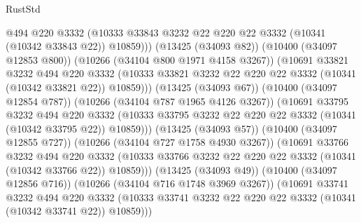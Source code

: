 \begin{lexlean}{RustStd}
\begin{coremodule}
                            @494
                            @220
                            @3332
                            (@10333
                              @33843
                              @3232
                              @22
                              @220
                              @22
                              @3332
                              (@10341 (@10342 @33843 @22))
                              @10859)))
                        (@13425 (@34093 @82))
                        (@10400 (@34097 @12853 @800))
                        (@10266 (@34104 @800 @1971 @4158 @3267))
                        (@10691
                          @33821
                          @3232
                          @494
                          @220
                          @3332
                          (@10333
                            @33821
                            @3232
                            @22
                            @220
                            @22
                            @3332
                            (@10341 (@10342 @33821 @22))
                            @10859)))
                      (@13425 (@34093 @67))
                      (@10400 (@34097 @12854 @787))
                      (@10266 (@34104 @787 @1965 @4126 @3267))
                      (@10691
                        @33795
                        @3232
                        @494
                        @220
                        @3332
                        (@10333
                          @33795
                          @3232
                          @22
                          @220
                          @22
                          @3332
                          (@10341 (@10342 @33795 @22))
                          @10859)))
                    (@13425 (@34093 @57))
                    (@10400 (@34097 @12855 @727))
                    (@10266 (@34104 @727 @1758 @4930 @3267))
                    (@10691
                      @33766
                      @3232
                      @494
                      @220
                      @3332
                      (@10333 @33766 @3232 @22 @220 @22 @3332 (@10341 (@10342 @33766 @22)) @10859)))
                  (@13425 (@34093 @49))
                  (@10400 (@34097 @12856 @716))
                  (@10266 (@34104 @716 @1748 @3969 @3267))
                  (@10691
                    @33741
                    @3232
                    @494
                    @220
                    @3332
                    (@10333 @33741 @3232 @22 @220 @22 @3332 (@10341 (@10342 @33741 @22)) @10859)))

\end{coremodule}
\end{lexlean}
